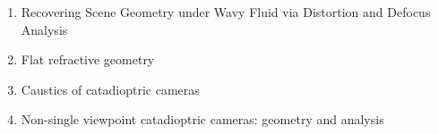 \begin{enumerate}
	
\item Recovering Scene Geometry under Wavy Fluid via Distortion and Defocus Analysis
\item Flat refractive geometry
\item Caustics of catadioptric cameras
\item Non-single viewpoint catadioptric cameras: geometry and
analysis
\end{enumerate}

